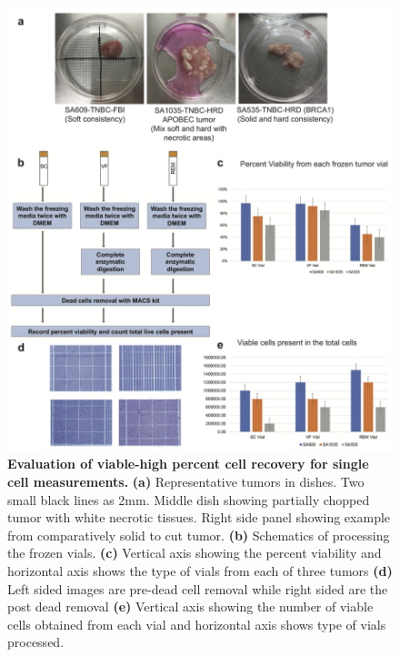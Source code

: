 \begin{figure}
	\centering
	\includegraphics[width=\textwidth]{Figures/chap3/cellviability2.png}
	\caption[Evaluation of viable-high percent cell recovery for single cell measurements]
	{\small
	    \textbf{Evaluation of viable-high percent cell recovery for single cell measurements.}
	    \textbf{(a)} Representative tumors in dishes. Two small black lines as 2mm. Middle dish showing partially chopped tumor with white necrotic tissues. Right side panel showing example from comparatively solid to cut tumor.
	    \textbf{(b)} Schematics of processing the frozen vials.
	    \textbf{(c)} Vertical axis showing the percent viability and horizontal axis shows the type of vials from each of three tumors  \textbf{(d)} Left sided images are pre-dead cell removal while right sided are the post dead removal \textbf{(e)} Vertical axis showing the number of viable cells obtained from each vial and horizontal axis shows type of vials processed.
	}
	\label{fig:cellviability}
\end{figure}


